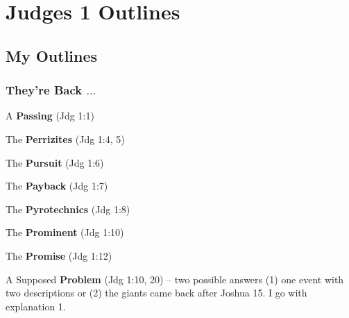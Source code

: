 \section{Judges 1 Outlines}

\subsection{My Outlines}

\subsubsection{They're Back  $\hdots$}
\begin{compactenum}[I.][8]
    \item   A \textbf{Passing}   (Jdg 1:1) 
    \item   The \textbf{Perrizites}    (Jdg 1:4, 5) 
    \item   The  \textbf{Pursuit}   (Jdg 1:6) 
    \item   The  \textbf{Payback}   (Jdg 1:7) 
    \item   The  \textbf{Pyrotechnics}   (Jdg 1:8) 
    \item   The  \textbf{Prominent}   (Jdg 1:10) 
    \item   The  \textbf{Promise}   (Jdg 1:12) 
    \item   A Supposed \textbf{Problem}    (Jdg 1:10, 20) -- two possible answers (1) one event with two descriptions or (2) the giants came back after Joshua 15. I go with explanation 1.
\end{compactenum}


